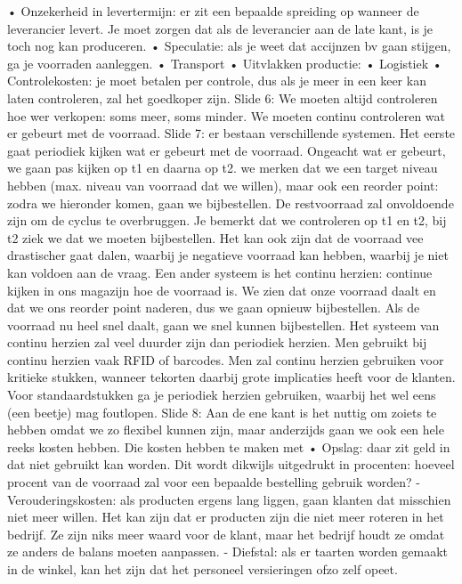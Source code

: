 \documentclass[10pt,a4paper]{report}
\begin{document}
	
	• Onzekerheid in levertermijn: er zit een bepaalde spreiding op wanneer de leverancier levert. Je moet zorgen dat als de leverancier aan de late kant, is je toch nog kan produceren.
	• Speculatie: als je weet dat accijnzen bv gaan stijgen, ga je voorraden aanleggen.
	• Transport
	• Uitvlakken productie:
	• Logistiek
	• Controlekosten: je moet betalen per controle, dus als je meer in een keer kan laten controleren, zal het goedkoper zijn.
Slide 6: We moeten altijd controleren hoe wer verkopen: soms meer, soms minder. We moeten continu controleren wat er gebeurt met de voorraad. 
Slide 7: er bestaan verschillende systemen. Het eerste gaat periodiek kijken wat er gebeurt met de voorraad. Ongeacht wat er gebeurt, we gaan pas kijken op t1 en daarna op t2. we merken dat we een target niveau hebben (max. niveau van voorraad dat we willen), maar ook een reorder point: zodra we hieronder komen, gaan we bijbestellen. De restvoorraad zal onvoldoende zijn om de cyclus te overbruggen. Je bemerkt dat we controleren op t1 en t2, bij t2 ziek we dat we moeten bijbestellen. Het kan ook zijn dat de voorraad vee drastischer gaat dalen, waarbij je negatieve voorraad kan hebben, waarbij je niet kan voldoen aan de vraag.
Een ander systeem is het continu herzien: continue kijken in ons magazijn hoe de voorraad is. We zien dat onze voorraad daalt en dat we ons reorder point naderen, dus we gaan opnieuw bijbestellen. Als de voorraad nu heel snel daalt, gaan we snel kunnen bijbestellen. 
Het systeem van continu herzien zal veel duurder zijn dan periodiek herzien. Men gebruikt bij continu herzien vaak RFID of barcodes. Men zal continu herzien gebruiken voor kritieke stukken, wanneer tekorten daarbij grote implicaties heeft voor de klanten. Voor standaardstukken ga je periodiek herzien gebruiken, waarbij het wel eens (een beetje) mag foutlopen.
Slide 8: Aan de ene kant is het nuttig om zoiets te hebben omdat we zo flexibel kunnen zijn, maar anderzijds gaan we ook een hele reeks kosten hebben. Die kosten hebben te maken met
	• Opslag: daar zit geld in dat niet gebruikt kan worden. Dit wordt dikwijls uitgedrukt in procenten: hoeveel procent van de voorraad zal voor een bepaalde bestelling gebruik worden?
		- Verouderingskosten: als producten ergens lang liggen, gaan klanten dat misschien niet meer willen. Het kan zijn dat er producten zijn die niet meer roteren in het bedrijf. Ze zijn niks meer waard voor de klant, maar het bedrijf houdt ze omdat ze anders de balans moeten aanpassen.
		- Diefstal: als er taarten worden gemaakt in de winkel, kan het zijn dat het personeel versieringen ofzo zelf opeet.
\end{document}
